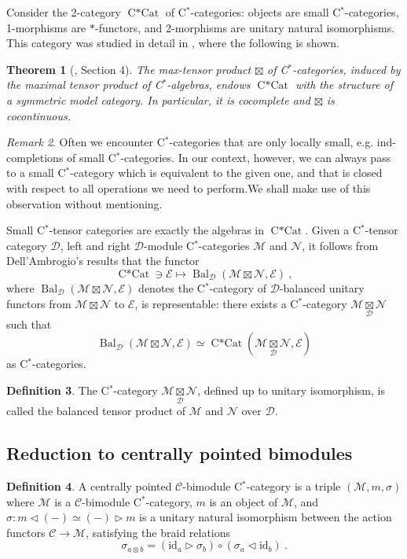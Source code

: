 \documentclass[a4paper,11pt,reqno]{amsart}
\numberwithin{equation}{section}
\newtheorem{theorem}{Theorem}[section]
\theoremstyle{remark}
\newtheorem{remark}[theorem]{Remark}
\theoremstyle{definition}
\newtheorem{definition}[theorem]{Definition}
\newcommand{\cC}{\mathcal C}
\newcommand{\cD}{\mathcal D}
\newcommand{\cE}{\mathcal E}
\newcommand{\cM}{\mathcal M}
\newcommand{\cN}{\mathcal N}
\DeclareMathOperator{\Bal}{Bal}
\DeclareMathOperator{\CCat}{C*Cat}
\newcommand{\id}{\mathrm{id}}
\begin{document}
Consider the 2-category $\CCat$ of C$^*$-categories: objects are small C$^*$-categories, 1-morphisms are $*$-functors, and 2-morphisms are unitary natural isomorphisms. This category was studied in detail in \cite{MR3007088}, where the following is shown.

\begin{theorem}[\cite{MR3007088}, Section 4]
	The max-tensor product $\boxtimes$ of C$^*$-categories, induced by the maximal tensor product of C$^*$-algebras, endows $\CCat$ with the structure of a symmetric model category. In particular, it is cocomplete and $\boxtimes$ is cocontinuous.
\end{theorem}

\begin{remark}
	Often we encounter C$^*$-categories that are only locally small, e.g. ind-completions of small C$^*$-categories. In our context, however, we can always pass to a small C$^*$-category which is equivalent to the given one, and that is closed with respect to all operations we need to perform.We shall make use of this observation without mentioning.
\end{remark}

Small C$^*$-tensor categories are exactly the algebras in $\CCat$. Given a C$^*$-tensor category $\cD$, left and right $\cD$-module C$^*$-categories $\cM$ and $\cN$, it follows from Dell'Ambrogio's results that the functor 
\[
\CCat \ni \cE \mapsto \Bal_\cD(\cM \boxtimes \cN, \cE) \ ,
\]
where $\Bal_\cD(\cM \boxtimes \cN, \cE)$ denotes the C$^*$-category of $\cD$-balanced unitary functors from $\cM \boxtimes \cN$ to $\cE$, is representable: there exists a C$^*$-category $\cM \underset{\cD}{\boxtimes} \cN$ such that
\[
\Bal_\cD(\cM \boxtimes \cN, \cE) \simeq \CCat(\cM \underset{\cD}{\boxtimes} \cN, \cE)
\]
as C$^*$-categories.

\begin{definition}
	The C$^*$-category $\cM \underset{\cD}{\boxtimes} \cN$, defined up to unitary isomorphism, is called the balanced tensor product of $\cM$ and $\cN$ over $\cD$.
\end{definition}

\subsection{Reduction to centrally pointed bimodules}

\begin{definition}
	A centrally pointed $\cC$-bimodule C$^*$-category is a triple $(\cM,m, \sigma)$ where $\cM$ is a $\cC$-bimodule C$^*$-category, $m$ is an object of $\cM$, and $\sigma: m \triangleleft (-) \simeq (-) \triangleright m$ is a unitary natural isomorphism between the action functors $\cC \to \cM$, satisfying the braid relations
	\[
	\sigma_{a\otimes b} = (\id_a \triangleright \sigma_b) \circ (\sigma_a \triangleleft \id_b) \ . 
	\]
\end{definition}
\end{document}
